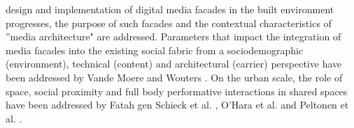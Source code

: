 design and implementation of digital media facades in the built environment progresses,
the purpose of such facades and the contextual characteristics of ''media
architecture" are addressed. Parameters that impact the integration of media
facades into the existing social fabric from a sociodemographic (environment),
technical (content) and architectural (carrier) perspective have been addressed by
Vande Moere and Wouters \cite{VandeMoere2012}. On the urban scale, the role of space, social
proximity and full body performative interactions in shared spaces have been
addressed by Fatah gen Schieck et al. \cite{Fatah2008}, O’Hara et al. \cite{Hara2008} and Peltonen et al. \cite{Peltonen2008}.

